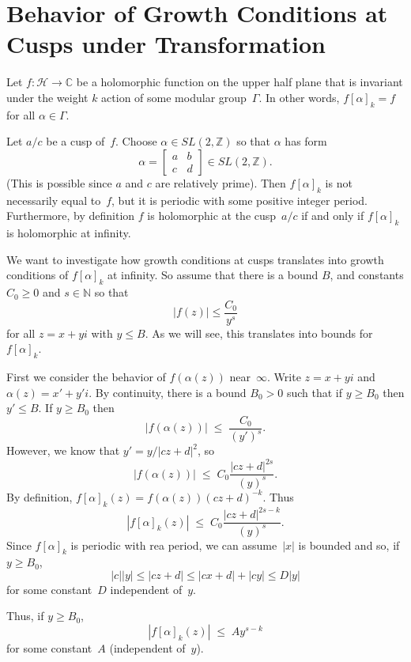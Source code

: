 \documentclass {amsart}
\theoremstyle{plain}
\theoremstyle{definition}
\theoremstyle{remark}
\newcommand{\bN}{{\mathbb{N}}}
\newcommand{\bZ}{{\mathbb{Z}}}
\newcommand{\bC}{{\mathbb{C}}}
\newcommand{\h}{{\mathcal{H}}}
\begin{document}

\section {Behavior of Growth Conditions at Cusps under Transformation}

Let $f: \h \to \bC$ be a holomorphic function on the upper half plane that is
invariant under the weight $k$ action of some modular group~$\Gamma$.
In other words, $f [\alpha]_k = f$ for all $\alpha \in\Gamma$. 

Let $a/c$ be a cusp
of~$f$. 
Choose $\alpha \in SL(2, \bZ)$ so that $\alpha$ has form
$$ \alpha = \begin{bmatrix}
       a & b         \\
       c & d
 \end{bmatrix}  \in SL (2, \bZ).$$
 (This is possible since $a$ and $c$ are relatively prime).
 Then $f [\alpha]_k$ is not necessarily equal to~$f$, but it is periodic with
 some positive integer period. Furthermore, by definition $f$ is holomorphic at 
 the cusp~$a/c$ if and only if $f [\alpha]_k$ is holomorphic at infinity.

We want to investigate how growth conditions at cusps translates into growth conditions
of $f [\alpha]_k$ at infinity. So  assume that there is a bound $B$, and constants $C_0 \ge 0$
and $s \in \bN$ so that
$$
|f(z)|  \le \frac{C_0}{y^{s}}
$$
for all $z = x + yi$ with $y \le B$.
As we will see, this translates into bounds for $f [\alpha]_k$.


First we consider the behavior of $f(\alpha(z))$ near~$\infty$. Write $z = x + y i$
and $\alpha(z) = x' + y' i$.
By continuity, there is a bound $B_0 > 0$ such that if $y \ge B_0$ then $y' \le B$.
If $y \ge B_0$ then
$$
|f(\alpha(z))|  \; \le \; \frac{C_0}{(y')^{s}}.
$$
However, we know that $y' = y / |c z + d|^2$, so
$$
|f(\alpha(z))|  \; \le \; C_0  \frac{ |c z + d|^{2 s}}{(y)^{s}}.
$$
By definition, $f [\alpha]_k (z) = f(\alpha (z)) (c z + d)^{-k}$.
Thus
$$
\left| f [\alpha]_k (z) \right|  \; \le \; C_0  \frac{ |c z + d|^{2 s - k}}{(y)^{s}}.
$$
Since $ f [\alpha]_k $ is periodic with rea period, we can assume~$|x|$
is bounded and so, if $y \ge B_0$,
$$|c| |y| \le |c z + d| \le |c x + d| + |c y| \le D |y|$$
for some constant~$D$ independent of~$y$. 

Thus, if $y \ge B_0$, 
$$
\left| f [\alpha]_k (z) \right|  \; \le \; A  y ^{s-k}
$$
for some constant~$A$ (independent of~$y$).

\end{document}
